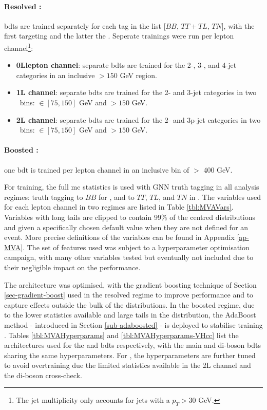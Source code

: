 \paragraph{Resolved \vhbc:} \gls{bdt}s are trained separately for each tag in the list [$BB$, $TT+TL$, $TN$], with the first targeting \vhb and the latter the \vhc. Seperate trainings were run per lepton channel\footnote{The jet multiplicity only accounts for jets with a $p_T > 30$ GeV.}:
\begin{itemize}
    \item \textbf{0Llepton channel}: separate \gls{bdt}s are trained for the 2-, 3-, and 4-jet categories in an inclusive \ptv $> 150$ GeV region.
    \item \textbf{1L channel}: separate \gls{bdt}s are trained for the 2- and 3-jet categories in two \ptv\ bins: \ptv $\in [75, 150]$ GeV and \ptv $> 150$ GeV.
    \item \textbf{2L channel}: separate \gls{bdt}s are trained for the 2- and 3p-jet categories in two \ptv\ bins: \ptv $\in [75, 150]$ GeV and \ptv $> 150$ GeV.
\end{itemize}
\paragraph{Boosted \vhb:} one \gls{bdt} is trained per lepton channel in an inclusive bin of \ptv $>$ 400 GeV.

For training, the full \gls{mc} statistics is used with GNN truth tagging in all analysis regimes: truth tagging to $BB$ for \vhb, and to $TT$, $TL$, and $TN$ in \vhc. The variables used for each lepton channel in two regimes are listed in Table \ref{tbl:MVAVars}. Variables with long tails are clipped to contain 99\% of the centred distributions and given a specifically chosen default value when they are not defined for an event. More precise definitions of the variables can be found in Appendix \ref{ap-MVA}. The set of features used was subject to a hyperparameter optimisation campaign, with many other variables tested but eventually not included due to their negligible impact on the performance. 



The architecture was optimised, with the gradient boosting technique of Section \ref{sec-gradient-boost} used in the resolved regime to improve performance and to capture effects outside the bulk of the distributions. In the boosted regime, due to the lower statistics available and large tails in the distribution, the AdaBoost method - introduced in Section \ref{sub-adaboosted} - is deployed to stabilise training \cite{Adaboost}. Tables \ref{tbl:MVAHyperparams} and \ref{tbl:MVAHyperparams-VHcc} list the architectures used for the \vhb and \vhc \gls{bdt}s respectively, with the main and di-boson \gls{bdt}s sharing the same hyperparameters. For \vhc, the hyperparameters are further tuned to avoid overtraining due the limited statistics available in the 2L channel and the di-boson cross-check.

